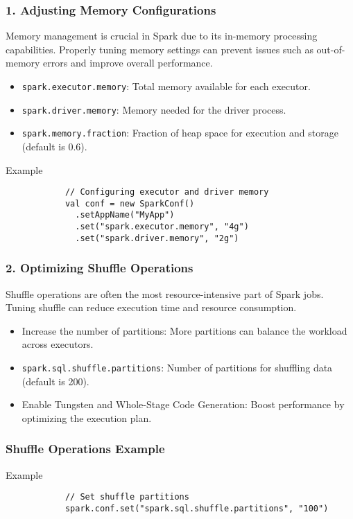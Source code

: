 \documentclass[aspectratio=169]{beamer}
\begin{document}
\begin{frame}[fragile]
    \frametitle{1. Adjusting Memory Configurations}
    Memory management is crucial in Spark due to its in-memory processing capabilities. Properly tuning memory settings can prevent issues such as out-of-memory errors and improve overall performance.
    
    \begin{itemize}
        \item \texttt{spark.executor.memory}: Total memory available for each executor.
        \item \texttt{spark.driver.memory}: Memory needed for the driver process.
        \item \texttt{spark.memory.fraction}: Fraction of heap space for execution and storage (default is 0.6).
    \end{itemize}
    
    \begin{block}{Example}
        \begin{lstlisting}
            // Configuring executor and driver memory
            val conf = new SparkConf()
              .setAppName("MyApp")
              .set("spark.executor.memory", "4g")
              .set("spark.driver.memory", "2g")
        \end{lstlisting}
    \end{block}
\end{frame}

\begin{frame}
    \frametitle{2. Optimizing Shuffle Operations}
    Shuffle operations are often the most resource-intensive part of Spark jobs. Tuning shuffle can reduce execution time and resource consumption.
    
    \begin{itemize}
        \item Increase the number of partitions: More partitions can balance the workload across executors.
        \item \texttt{spark.sql.shuffle.partitions}: Number of partitions for shuffling data (default is 200).
        \item Enable Tungsten and Whole-Stage Code Generation: Boost performance by optimizing the execution plan.
    \end{itemize}
\end{frame}

\begin{frame}[fragile]
    \frametitle{Shuffle Operations Example}
    \begin{block}{Example}
        \begin{lstlisting}
            // Set shuffle partitions
            spark.conf.set("spark.sql.shuffle.partitions", "100")
        \end{lstlisting}
    \end{block}
\end{frame}
\end{document}
